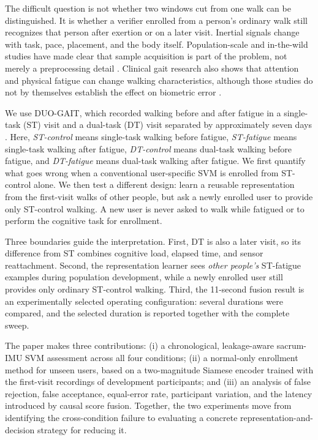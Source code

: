 \documentclass[conference]{IEEEtran}
\begin{document}
The difficult question is not whether two windows cut from one walk can be distinguished. It is whether a verifier enrolled from a person's ordinary walk still recognizes that person after exertion or on a later visit. Inertial signals change with task, pace, placement, and the body itself. Population-scale and in-the-wild studies have made clear that sample acquisition is part of the problem, not merely a preprocessing detail \cite{Ngo2014,Zou2020}. Clinical gait research also shows that attention and physical fatigue can change walking characteristics, although those studies do not by themselves establish the effect on biometric error \cite{Yogev2008,Granacher2010}.

We use DUO-GAIT, which recorded walking before and after fatigue in a single-task (ST) visit and a dual-task (DT) visit separated by approximately seven days \cite{Zhou2023}. Here, \emph{ST-control} means single-task walking before fatigue, \emph{ST-fatigue} means single-task walking after fatigue, \emph{DT-control} means dual-task walking before fatigue, and \emph{DT-fatigue} means dual-task walking after fatigue. We first quantify what goes wrong when a conventional user-specific SVM is enrolled from ST-control alone. We then test a different design: learn a reusable representation from the first-visit walks of other people, but ask a newly enrolled user to provide only ST-control walking. A new user is never asked to walk while fatigued or to perform the cognitive task for enrollment.

Three boundaries guide the interpretation. First, DT is also a later visit, so its difference from ST combines cognitive load, elapsed time, and sensor reattachment. Second, the representation learner sees \emph{other people's} ST-fatigue examples during population development, while a newly enrolled user still provides only ordinary ST-control walking. Third, the 11-second fusion result is an experimentally selected operating configuration: several durations were compared, and the selected duration is reported together with the complete sweep.

The paper makes three contributions: (i) a chronological, leakage-aware sacrum-IMU SVM assessment across all four conditions; (ii) a normal-only enrollment method for unseen users, based on a two-magnitude Siamese encoder trained with the first-visit recordings of development participants; and (iii) an analysis of false rejection, false acceptance, equal-error rate, participant variation, and the latency introduced by causal score fusion. Together, the two experiments move from identifying the cross-condition failure to evaluating a concrete representation-and-decision strategy for reducing it.
\end{document}
